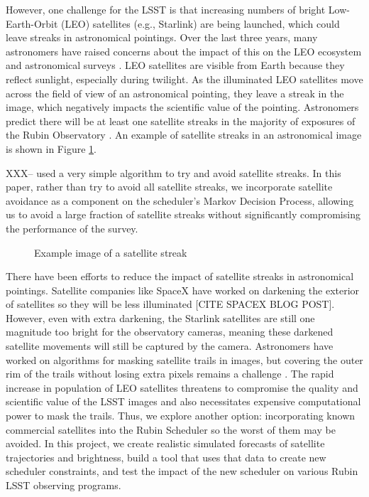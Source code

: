 \documentclass[linenumbers]{aastex631}
\begin{document}
However, one challenge for the LSST is that increasing numbers of bright
Low-Earth-Orbit (LEO) satellites (e.g., Starlink) are being launched, which could leave streaks
in astronomical pointings. Over the last three years, many astronomers have raised concerns
about the impact of this on the LEO ecosystem and astronomical surveys \citep{lawrence22,tyson20}. LEO satellites
are visible from Earth because they reflect sunlight, especially during twilight. As the
illuminated LEO satellites move across the field of view of an astronomical pointing, they leave
a streak in the image, which negatively impacts the scientific value of the pointing. Astronomers
predict there will be at least one satellite streaks in the majority of exposures of the Rubin
Observatory \citep{lawrence22}. %
An example of satellite streaks in an astronomical image is shown in Figure \ref{fig-streaks}.

XXX--\citet{tyson20} used a very simple algorithm to try and avoid satellite streaks.  In this paper, rather than try to avoid all satellite streaks, we incorporate satellite avoidance as a component on the scheduler's Markov Decision Process, allowing us to avoid a large fraction of satellite streaks without significantly compromising the performance of the survey. 

\begin{figure}[ht!]
\caption{Example image of a satellite streak \label{fig-streaks}}
\end{figure}

There have been efforts to reduce the impact of satellite streaks in astronomical pointings.
Satellite companies like SpaceX have worked on darkening the exterior of satellites so they will
be less illuminated [CITE SPACEX BLOG POST]. However, even with extra darkening, the Starlink satellites are still one
magnitude too bright for the observatory cameras, meaning these darkened satellite movements
will still be captured by the camera. Astronomers have worked on algorithms for masking
satellite trails in images, but covering the outer rim of the trails without losing extra pixels
remains a challenge \citep{tyson20}.
The rapid increase in population of LEO satellites threatens to compromise the quality
and scientific value of the LSST images and also necessitates expensive computational power to
mask the trails. Thus, we explore another option: incorporating known commercial satellites into
the Rubin Scheduler so the worst of them may be avoided. In this project, we create realistic
simulated forecasts of satellite trajectories and brightness, build a tool that uses that data to create
new scheduler constraints, and test the impact of the new scheduler on various Rubin LSST
observing programs.
\end{document}
